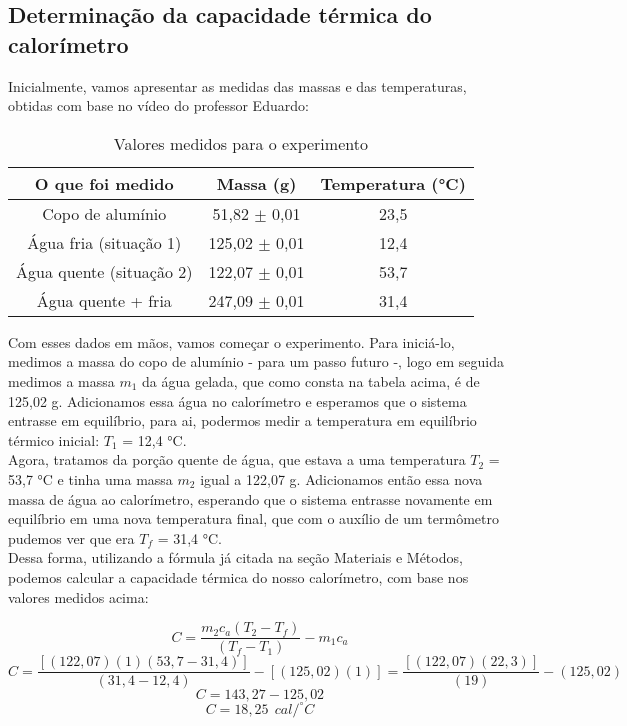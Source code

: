 \subsection{Determinação da capacidade térmica do calorímetro}

Inicialmente, vamos apresentar as medidas das massas e das temperaturas, obtidas com base no vídeo do professor Eduardo:

\begin{table}[H]
    \centering
    \begin{tabular}{ |c||c||c| }
        \hline
        \textbf{O que foi medido} & \textbf{Massa (g)} & \textbf{Temperatura (°C)}\\
        \hline 
        Copo de alumínio  & 51,82 $\pm$ 0,01 & 23,5 \\
        Água fria (situação 1)     & 125,02 $\pm$ 0,01   & 12,4  \\  
        Água quente (situação 2)   & 122,07 $\pm$ 0,01   & 53,7  \\
        \hline
        Água quente + fria & 247,09 $\pm$ 0,01 & 31,4 \\
        \hline
        \end{tabular}
    \caption{Valores medidos para o experimento} 
\end{table}

Com esses dados em mãos, vamos começar o experimento. Para iniciá-lo, medimos a massa do copo de alumínio - para um passo futuro -, logo em seguida medimos a massa $m_1$ da água gelada, que como consta na tabela acima, é de 125,02 g. Adicionamos essa água no calorímetro e esperamos que o sistema entrasse em equilíbrio, para ai, podermos medir a temperatura em equilíbrio térmico inicial: $T_1$ = 12,4 °C.\\

Agora, tratamos da porção quente de água, que estava a uma temperatura $T_2$ = 53,7 °C e tinha uma massa $m_2$ igual a 122,07 g. Adicionamos então essa nova massa de água ao calorímetro, esperando que o sistema entrasse novamente em equilíbrio em uma nova temperatura final, que com o auxílio de um termômetro pudemos ver que era $T_f$ = 31,4 °C.\\

Dessa forma, utilizando a fórmula já citada na seção Materiais e Métodos, podemos calcular a capacidade térmica do nosso calorímetro, com base nos valores medidos acima:

\[C =  \frac{m_2 c_a (T_2 - T_f) }{(T_f - T_1)} - m_1 c_a \]
\[C =  \frac{[(122,07) (1) (53,7 - 31,4)]}{(31,4 - 12,4)} - [(125,02) (1)] =  \frac{[(122,07)(22,3)] }{(19)} - (125,02)\]
\[C =  143,27 - 125,02\]
\[C = 18,25 \ \ cal/^\circ C\]

